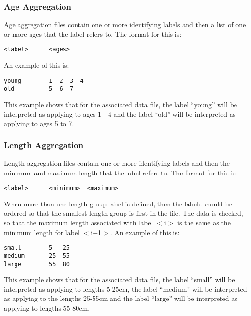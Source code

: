 \documentclass[]{book}
\begin{document}
\hypertarget{subsec:ageagg}{%
\subsubsection{Age Aggregation}\label{subsec:ageagg}}

Age aggregation files contain one or more identifying labels and then a
list of one or more ages that the label refers to. The format for this
is:

\begin{verbatim}
<label>      <ages>
\end{verbatim}

An example of this is:

\begin{verbatim}
young        1  2  3  4
old          5  6  7
\end{verbatim}

This example shows that for the associated data file, the label ``young''
will be interpreted as applying to ages 1 - 4 and the label ``old'' will
be interpreted as applying to ages 5 to 7.

\hypertarget{subsec:lenagg}{%
\subsubsection{Length Aggregation}\label{subsec:lenagg}}

Length aggregation files contain one or more identifying labels and then
the minimum and maximum length that the label refers to. The format for
this is:

\begin{verbatim}
<label>      <minimum>  <maximum>
\end{verbatim}

When more than one length group label is defined, then the labels should
be ordered so that the smallest length group is first in the file. The
data is checked, so that the maximum length associated with label
\(<\)i\(>\) is the same as the minimum length for label \(<\)i+1\(>\). An
example of this is:

\begin{verbatim}
small        5   25
medium       25  55
large        55  80
\end{verbatim}

This example shows that for the associated data file, the label ``small''
will be interpreted as applying to lengths 5-25cm, the label ``medium''
will be interpreted as applying to the lengths 25-55cm and the label
``large'' will be interpreted as applying to lengths 55-80cm.
\end{document}
